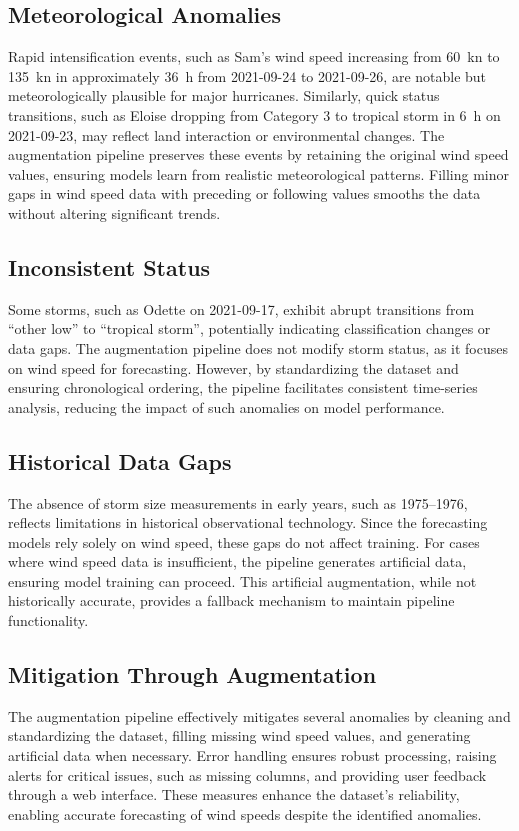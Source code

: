 \subsection{Meteorological Anomalies}
Rapid intensification events, such as Sam’s wind speed increasing from \SI{60}{\knot} to \SI{135}{\knot} in approximately \SI{36}{\hour} from 2021-09-24 to 2021-09-26, are notable but meteorologically plausible for major hurricanes. Similarly, quick status transitions, such as Eloise dropping from Category 3 to tropical storm in \SI{6}{\hour} on 2021-09-23, may reflect land interaction or environmental changes. The augmentation pipeline preserves these events by retaining the original wind speed values, ensuring models learn from realistic meteorological patterns. Filling minor gaps in wind speed data with preceding or following values smooths the data without altering significant trends.

\subsection{Inconsistent Status}
Some storms, such as Odette on 2021-09-17, exhibit abrupt transitions from ``other low'' to ``tropical storm'', potentially indicating classification changes or data gaps. The augmentation pipeline does not modify storm status, as it focuses on wind speed for forecasting. However, by standardizing the dataset and ensuring chronological ordering, the pipeline facilitates consistent time-series analysis, reducing the impact of such anomalies on model performance.

\subsection{Historical Data Gaps}
The absence of storm size measurements in early years, such as 1975--1976, reflects limitations in historical observational technology. Since the forecasting models rely solely on wind speed, these gaps do not affect training. For cases where wind speed data is insufficient, the pipeline generates artificial data, ensuring model training can proceed. This artificial augmentation, while not historically accurate, provides a fallback mechanism to maintain pipeline functionality.

\subsection{Mitigation Through Augmentation}
The augmentation pipeline effectively mitigates several anomalies by cleaning and standardizing the dataset, filling missing wind speed values, and generating artificial data when necessary. Error handling ensures robust processing, raising alerts for critical issues, such as missing columns, and providing user feedback through a web interface. These measures enhance the dataset’s reliability, enabling accurate forecasting of wind speeds despite the identified anomalies.

